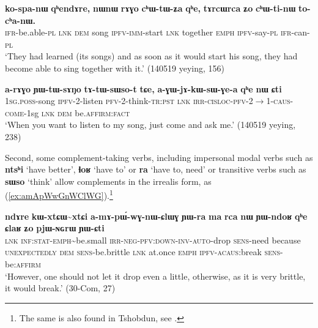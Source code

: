\documentclass[oneside,a4paper,11pt]{article}
\newcommand{\ipa}[1]{\textbf{\phon#1}} %
\newcommand{\jpg}[2]{\ipa{#1} `#2'} %
\newcommand{\tld}{\textasciitilde{}}
\begin{document}
\begin{exe}
\ex \label{ex:chWtinW}
\gll 
\ipa{ko-spa-nɯ} 	\ipa{qʰendɤre,} 	\ipa{nɯnɯ} 	\ipa{rɤɣo} 	\ipa{cʰɯ-tɯ-ʑa} 	\ipa{qʰe,} 	\ipa{tɤrcɯrca} 	\ipa{ʑo} 	\ipa{cʰɯ-ti-nɯ} 	\ipa{to-cʰa-nɯ.} \\
\textsc{ifr}-be.able-\textsc{pl} \textsc{lnk} \textsc{dem} song \textsc{ipfv-imm}-start \textsc{lnk} together \textsc{emph} \textsc{ipfv}-say-\textsc{pl} \textsc{ifr}-can-\textsc{pl} \\
\glt `They had learned (its songs) and as soon as it would start his song, they had become able to sing together with it.' (140519 yeying, 156)
\end{exe}

\begin{exe}
\ex \label{ex:tAtWsWsot}
\gll \ipa{a-rɤɣo} 	\ipa{ɲɯ-tɯ-sɤŋo} 	\ipa{tɤ-tɯ-sɯso-t} 	\ipa{tɕe,} 	\ipa{a-ɣɯ-jɤ-kɯ-sɯ-ɣe-a} 	\ipa{qʰe} 	\ipa{nɯ} 	\ipa{ɕti} \\
\textsc{1sg.poss}-song \textsc{ipfv}-2-listen \textsc{pfv}-2-think-\textsc{tr:pst} \textsc{lnk} \textsc{irr-cisloc-pfv-2$\rightarrow$1-caus-come}-1sg \textsc{lnk} \textsc{dem} be.\textsc{affirm:fact} \\
\glt `When you want to listen to my song, just come and ask me.' (140519 yeying, 238)
\end{exe}

Second, some complement-taking verbs, including impersonal modal verbs such as \jpg{ntsʰi}{have better}, \jpg{ɬoʁ}{have to} or \jpg{ra}{have to, need} or transitive verbs such as \jpg{sɯso}{think} allow complements in the irrealis form, as (\ref{ex:amApWwGnWClWG}).\footnote{The same is also found in Tshobdun, see \citet[483]{sun12complementation}.}

\begin{exe}
\ex \label{ex:amApWwGnWClWG}
\gll 
\ipa{ndɤre} 	\ipa{kɯ-xtɕɯ\tld{}xtɕi} 	\ipa{a-mɤ-pɯ́-wɣ-nɯ-ɕlɯɣ} 	\ipa{ɲɯ-ra} 	\ipa{ma} 	\ipa{rca} 	\ipa{nɯ} 	\ipa{ɲɯ-ndoʁ} 	\ipa{qʰe} 	\ipa{ɕlaʁ} 	\ipa{ʑo} 	\ipa{pjɯ-ɴɢrɯ} 	\ipa{ɲɯ-ɕti} \\
\textsc{lnk} \textsc{inf:stat-emph}\tld{}be.small \textsc{irr-neg-pfv:down-inv-auto}-drop \textsc{sens}-need because \textsc{unexpectedly} \textsc{dem} \textsc{sens}-be.brittle \textsc{lnk} at.once \textsc{emph} \textsc{ipfv-acaus}:break \textsc{sens}-be:\textsc{affirm} \\
\glt `However, one should not let it drop even a little, otherwise, as it is very brittle, it would break.' (30-Com, 27)
\end{exe}
\end{document}
